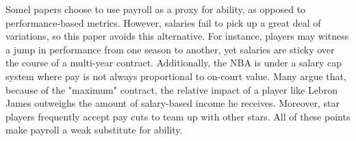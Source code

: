 Somel papers choose to use payroll as a proxy for ability, as opposed to performance-based metrics. However, salaries fail to pick up a great deal of variations, so this paper avoids this alternative. For instance, players may witness a jump in performance from one season to another, yet salaries are sticky over the course of a multi-year contract. Additionally, the NBA is under a salary cap system where pay is not always proportional to on-court value. Many argue that, because of the "maximum" contract, the relative impact of a player like Lebron James outweighs the amount of salary-based income he receives. Moreover, star players frequently accept pay cuts to team up with other stars. All of these points make payroll a weak substitute for ability. 